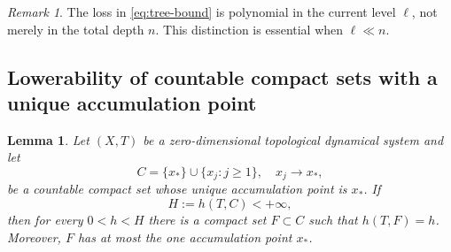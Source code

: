 \documentclass[12pt,letterpaper,reqno]{amsart}
\newtheorem{lemma}[theorem]{Lemma}
\theoremstyle{definition}
\theoremstyle{remark}
\newtheorem{remark}[theorem]{Remark}
\numberwithin{equation}{section}
\begin{document}
	\begin{remark}
		The loss in \eqref{eq:tree-bound} is polynomial in the current level $\ell$,
		not merely in the total depth $n$. This distinction is essential when
		$\ell\ll n$.
	\end{remark}
	
	\subsection{Lowerability of countable compact sets with a unique accumulation point}
	\label{sec:one-limit}
	
	\begin{lemma}
		\label{lem:one-limit-point}
		Let $(X,T)$ be a zero-dimensional topological dynamical system and let
		\[
		C=\{x_*\}\cup\{x_j:j\geq1\},
		\quad x_j\longrightarrow x_*,
		\]
		be a countable compact set whose unique accumulation point is $x_*$. If
		\[
		H:=h(T,C)<+\infty,
		\]
		then for every $0<h<H$ there is a compact set $F\subset C$ such that
		$h(T,F)=h$. Moreover, $F$ has at most the one accumulation point $x_*$.
	\end{lemma}
	
\end{document}
